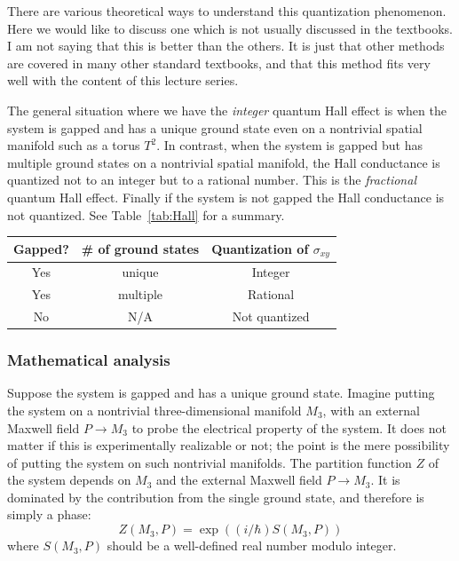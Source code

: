 \documentclass[12pt]{article}
\numberwithin{equation}{section}
\numberwithin{figure}{section}
\theoremstyle{remark}
\renewenvironment{table}[1][]{
  \begin{originaltable}[#1]
    \begin{mdframed}[linecolor=black!0,backgroundcolor=black!1]
}{
    \end{mdframed}
  \end{originaltable}
}
\begin{document}
There are various theoretical ways to understand this quantization phenomenon.
Here we would like to discuss one which is not usually discussed in the textbooks.
I am not saying that this is better than the others.
It is just that other methods are covered in many other standard textbooks,
and that this method fits very well with the content of this lecture series.

The general situation where we have the \emph{integer} quantum Hall effect is
when the system is gapped and has a unique ground state
even on a nontrivial spatial manifold such as a torus $T^2$.
In contrast, when the system is gapped but has multiple ground states
on a nontrivial spatial manifold,
the Hall conductance is quantized not to an integer but to a rational number.
This is the \emph{fractional} quantum Hall effect.
Finally if the system is not gapped the Hall conductance is not quantized.
See Table~\ref{tab:Hall} for a summary.

\begin{table}
  \centering
\begin{tabular}{c|c||c}
Gapped?  & \# of ground states & Quantization of $\sigma_{xy}$\\
\hline
Yes& unique  & Integer\\
Yes& multiple  & Rational\\
No & N/A & Not quantized
\end{tabular}
\caption{Quantization of the Hall conductance in various situations.
\label{tab:Hall}}
\end{table}

\subsubsection{Mathematical analysis}

Suppose the system is gapped and has a unique ground state.
Imagine putting the system on a nontrivial three-dimensional manifold $M_3$,
with an external Maxwell field $P\to M_3$ 
to probe the electrical property of the system.
It does not matter if this is experimentally realizable or not;
the point is the mere possibility of putting the system on such nontrivial manifolds.
The partition function $Z$ of the system 
depends on $M_3$ and the external Maxwell field $P\to M_3$.
It is dominated by the contribution from the single ground state,
and therefore is simply a phase: \begin{equation}
Z(M_3,P) = \exp( (i/\hbar) S(M_3,P))\label{eq:Zphase}
\end{equation}
where $S(M_3,P)$ should be a well-defined real number modulo integer.
\end{document}
